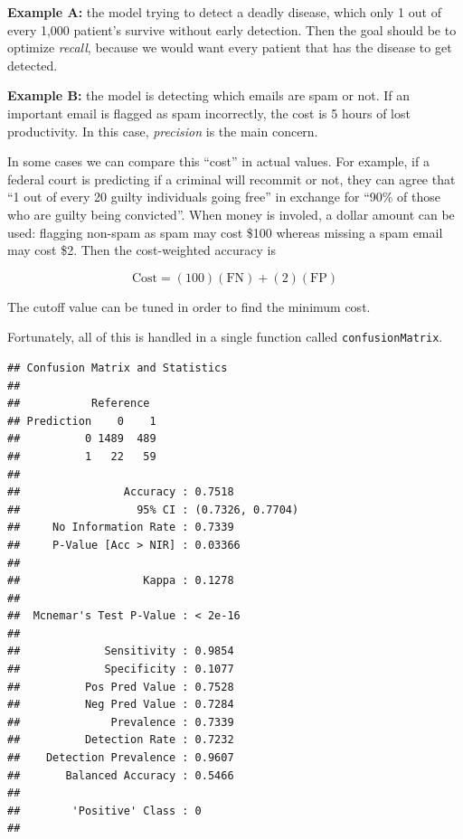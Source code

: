 \documentclass[
  openany]{book}
\newenvironment{Shaded}{\begin{snugshade}}{\end{snugshade}}
\newcommand{\KeywordTok}[1]{\textcolor[rgb]{0.13,0.29,0.53}{\textbf{#1}}}
\newcommand{\NormalTok}[1]{#1}
\newcommand{\OperatorTok}[1]{\textcolor[rgb]{0.81,0.36,0.00}{\textbf{#1}}}
\begin{document}
\textbf{Example A:} the model trying to detect a deadly disease, which only 1 out of every 1,000 patient's survive without early detection. Then the goal should be to optimize \emph{recall}, because we would want every patient that has the disease to get detected.

\textbf{Example B:} the model is detecting which emails are spam or not. If an important email is flagged as spam incorrectly, the cost is 5 hours of lost productivity. In this case, \emph{precision} is the main concern.

In some cases we can compare this ``cost'' in actual values. For example, if a federal court is predicting if a criminal will recommit or not, they can agree that ``1 out of every 20 guilty individuals going free'' in exchange for ``90\% of those who are guilty being convicted''. When money is involed, a dollar amount can be used: flagging non-spam as spam may cost \$100 whereas missing a spam email may cost \$2. Then the cost-weighted accuracy is

\[\text{Cost} = (100)(\text{FN}) + (2)(\text{FP})\]

The cutoff value can be tuned in order to find the minimum cost.

Fortunately, all of this is handled in a single function called \texttt{confusionMatrix}.

\begin{Shaded}
\end{Shaded}

\begin{verbatim}
## Confusion Matrix and Statistics
## 
##           Reference
## Prediction    0    1
##          0 1489  489
##          1   22   59
##                                           
##                Accuracy : 0.7518          
##                  95% CI : (0.7326, 0.7704)
##     No Information Rate : 0.7339          
##     P-Value [Acc > NIR] : 0.03366         
##                                           
##                   Kappa : 0.1278          
##                                           
##  Mcnemar's Test P-Value : < 2e-16         
##                                           
##             Sensitivity : 0.9854          
##             Specificity : 0.1077          
##          Pos Pred Value : 0.7528          
##          Neg Pred Value : 0.7284          
##              Prevalence : 0.7339          
##          Detection Rate : 0.7232          
##    Detection Prevalence : 0.9607          
##       Balanced Accuracy : 0.5466          
##                                           
##        'Positive' Class : 0               
## 
\end{verbatim}
\end{document}

